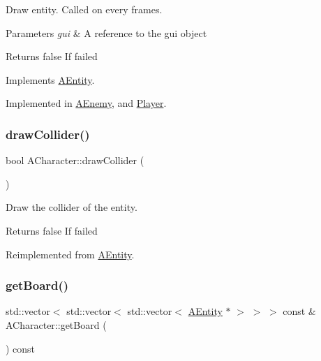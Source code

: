 Draw entity. Called on every frames. 


\begin{DoxyParams}{Parameters}
{\em gui} & A reference to the gui object \\
\hline
\end{DoxyParams}
\begin{DoxyReturn}{Returns}
false If failed 
\end{DoxyReturn}


Implements \hyperlink{class_a_entity_ad9404a7cae108eb81d881d256cacdc12}{A\+Entity}.



Implemented in \hyperlink{class_a_enemy_a527fc4b7bb46c04c486fd025a01e16a9}{A\+Enemy}, and \hyperlink{class_player_a1194c157df144e864d0328d267dfa75c}{Player}.

\mbox{\label{class_a_character_a2cc5faf1d9047d9e51154d5663fa6c67}} 
\subsubsection{\texorpdfstring{draw\+Collider()}{drawCollider()}}
{\footnotesize\ttfamily bool A\+Character\+::draw\+Collider (\begin{DoxyParamCaption}{ }\end{DoxyParamCaption})\hspace{0.3cm}{\ttfamily [virtual]}}



Draw the collider of the entity. 

\begin{DoxyReturn}{Returns}
false If failed 
\end{DoxyReturn}


Reimplemented from \hyperlink{class_a_entity_aca789d9c82a5fd3da3b196a36e748e8b}{A\+Entity}.

\mbox{\label{class_a_character_adecb8064d5070f15a2d6aa76a151ff33}} 
\subsubsection{\texorpdfstring{get\+Board()}{getBoard()}\hspace{0.1cm}{\footnotesize\ttfamily [1/2]}}
{\footnotesize\ttfamily std\+::vector$<$ std\+::vector$<$ std\+::vector$<$ \hyperlink{class_a_entity}{A\+Entity} $\ast$ $>$ $>$ $>$ const  \& A\+Character\+::get\+Board (\begin{DoxyParamCaption}{ }\end{DoxyParamCaption}) const\hspace{0.3cm}{\ttfamily [virtual]}}



